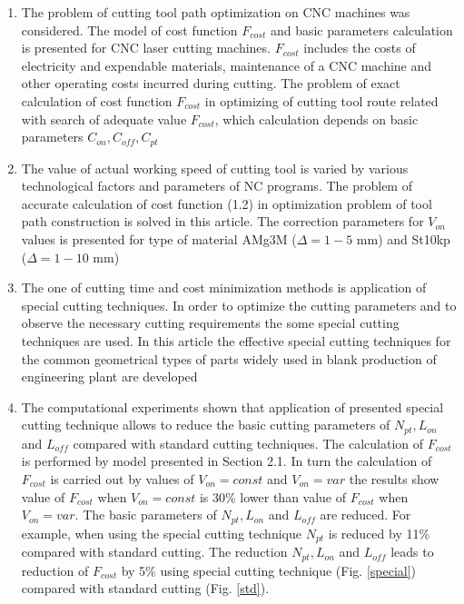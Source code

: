 \documentclass[runningheads]{llncs}
\begin{document}
\begin{enumerate}

\item  The problem of cutting tool path optimization on CNC machines was considered.
The model of cost function $F_{cost}$ and basic parameters calculation is presented for CNC laser cutting machines.
$F_{cost}$ includes the costs of electricity and expendable materials,
maintenance of a CNC machine and other operating costs incurred during cutting.
The problem of exact calculation of cost function  $F_{cost}$
in optimizing of cutting tool route related with search of adequate value  $F_{cost}$,
which calculation depends on basic parameters $C_{on}, C_{off}, C_{pt}$

\item The value of actual working speed of cutting tool is varied
by various technological factors and parameters of NC programs.
The problem of accurate calculation of cost function (1.2)
in optimization problem of tool path construction is solved in this article.
The correction parameters for $V_{on}$ values
is presented for type of material AMg3M ($\Delta=1-5$ mm) and St10kp ($\Delta=1-10$ mm)

\item The one of cutting time and cost minimization methods is application of special cutting techniques.
In order to optimize the cutting parameters and to observe the necessary cutting requirements
the some special cutting techniques are used.
In this article the effective special cutting techniques
for the common geometrical types of parts
widely used in blank production of engineering plant are developed

\item The computational experiments shown that
application of presented special cutting technique allows to
reduce the basic cutting parameters of $N_{pt}, L_{on}$
and $L_{off}$ compared with standard cutting techniques.
The calculation of $F_{cost}$ is performed by model presented in Section 2.1.
In turn the calculation of  $F_{cost}$ is carried out by values of
$V_{on}=const$ and $V_{on}=var$
the results show value of $F_{cost}$ when $V_{on}=const$  is 30\% lower
than value of $F_{cost}$  when $V_{on}=var$.
The basic parameters of $N_{pt}, L_{on}$
and $L_{off}$
are reduced.
For example, when using the special cutting technique
$N_{pt}$ is reduced by 11\%  compared with standard cutting.
The reduction $N_{pt}, L_{on}$
and $L_{off}$
leads to reduction of $F_{cost}$ by 5\%
using special cutting technique (Fig. \ref{special})
compared with standard cutting (Fig. \ref{std}).

\end{enumerate}



\nocite{*}
\end{document}
